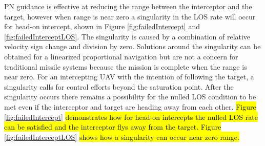 \documentclass[conference]{IEEEtran}
\begin{document}



PN guidance is effective at reducing the range between the interceptor and the target, however when range is near zero a singularity in the LOS rate will occur for head-on intercept, shown in Figure \ref{fig:failedIntercept} and \ref{fig:failedInterceptLOS}. The singularity is caused by a combination of relative velocity sign change and division by zero. Solutions around the singularity can be obtained for a linearized proportional navigation \cite{singularitySolution} but are not a concern for traditional missile systems because the mission is complete when the range is near zero. For an intercepting UAV with the intention of following the target, a singularity  calls for control efforts beyond the saturation point. After the singularity occurs there remains a possibility for the nulled LOS condition to be met even if the interceptor and target are heading away from each other. \hl{Figure} \ref{fig:failedIntercept} \hl{demonstrates how for head-on intercepts the nulled LOS rate can be satisfied and the interceptor flys away from the target. Figure} \ref{fig:failedInterceptLOS} \hl{shows how a singularity can occur near zero range.}
\end{document}
